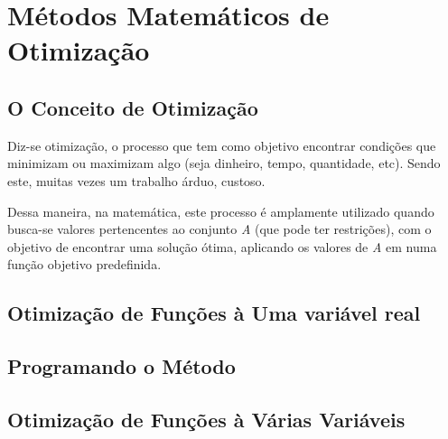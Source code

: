 

\chapter{\Large{Métodos Matemáticos de Otimização}}\label{chp:1}


\section{{O Conceito de Otimização}}

\hspace{0.8cm}
Diz-se otimização, o processo que tem como objetivo encontrar condições que
minimizam ou maximizam algo (seja dinheiro, tempo, quantidade, etc). Sendo este, muitas vezes um trabalho árduo,
custoso.

Dessa maneira, na matemática, este processo é amplamente utilizado quando
busca-se valores pertencentes ao conjunto \textit{A} (que pode ter
restrições), com o objetivo de encontrar uma solução ótima, aplicando os valores
de \textit{A} em numa função objetivo predefinida.



\section{{Otimização de Funções à Uma variável real}}

\hspace{0.8cm}

\section{{Programando o Método}}

\hspace{0.8cm}

\textcolor[rgb]{1,0,0}{\section{{Otimização de Funções à Várias Variáveis}}}

\hspace{0.8cm}
